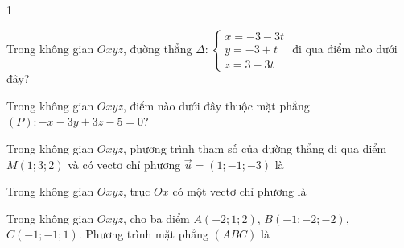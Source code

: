 \begin{deontap}{1}
\phanI
\begin{cau}Trong không gian $Oxyz$, đường thẳng $\Delta\colon \begin{cases}x=-3-3t\\y=-3+t\\z=3-3t\end{cases}$ đi qua điểm nào dưới đây?
\end{cau}
\begin{cau}Trong không gian $Oxyz$, điểm nào dưới đây thuộc mặt phẳng $(P)\colon -x-3y+3z-5=0$?
\end{cau}
\begin{cau}Trong không gian $Oxyz$, phương trình tham số của đường thẳng đi qua điểm $M(1;3;2)$ và có vectơ chỉ phương $\vec u=(1;-1;-3)$ là
\end{cau}
\begin{cau}Trong không gian $Oxyz$, trục $Ox$ có một vectơ chỉ phương là
\end{cau}
\begin{cau}Trong không gian $Oxyz$, cho ba điểm $A(-2;1;2)$, $B(-1;-2;-2)$, $C(-1;-1;1)$. Phương trình mặt phẳng $(ABC)$ là

\end{cau}
\end{deontap}
